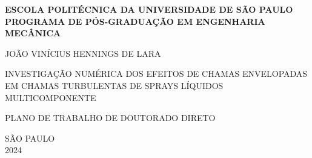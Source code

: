 \begin{titlepage}
    \centering
    \large\bfseries
    ESCOLA POLITÉCNICA DA UNIVERSIDADE DE SÃO PAULO
    PROGRAMA DE PÓS-GRADUAÇÃO EM ENGENHARIA MECÂNICA

    \vspace*{4cm}

    JOÃO VINÍCIUS HENNINGS DE LARA

    \vspace{3cm}

    INVESTIGAÇÃO NUMÉRICA DOS EFEITOS DE CHAMAS ENVELOPADAS EM CHAMAS TURBULENTAS DE SPRAYS LÍQUIDOS MULTICOMPONENTE

    \vspace{4cm}

    PLANO DE TRABALHO DE DOUTORADO DIRETO

    \vfill

    SÃO PAULO\\
    2024
\end{titlepage}
